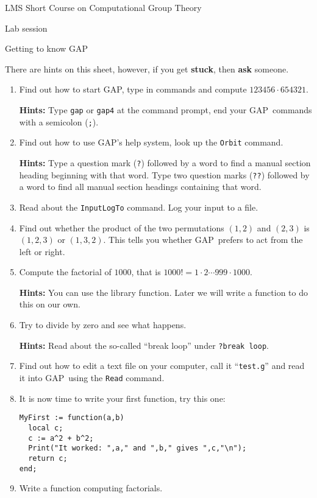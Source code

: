 \documentclass[12pt]{article}
\newcommand{\GAP}{\textsf{GAP}}
\begin{document}
\begin{center}
\large LMS Short Course on Computational Group Theory

\Large Lab session

\large Getting to know \GAP
\end{center}

There are hints on this sheet, however, if you get \textbf{stuck}, then
\textbf{ask} someone.

\begin{enumerate}
\setlength{\parskip}{0pt}
\item Find out how to start \GAP, type in commands and compute
$123456 \cdot 654321$.

\textbf{Hints:} Type \texttt{gap} or \texttt{gap4} at the command prompt,
end your \GAP\ commands with a semicolon (\texttt{;}).

\item Find out how to use \GAP's help system, look up the \texttt{Orbit}
command.

\textbf{Hints:} Type a question mark (\texttt{?}) followed by a word
to find a manual section heading beginning with that word. Type two
question marks (\texttt{??}) followed by a word to find all manual
section headings containing that word.

\item Read about the \texttt{InputLogTo} command. Log your input to a file.
\item Find out whether the product of the two permutations $(1,2)$ and
$(2,3)$ is $(1,2,3)$ or $(1,3,2)$. This tells you whether \GAP\ prefers
to act from the left or right.

\item Compute the factorial of $1000$, that is $1000! = 1 \cdot 2 \cdots
999 \cdot 1000$.

\textbf{Hints:} You can use the library function. Later we will write
a function to do this on our own.
\item Try to divide by zero and see what happens.

\textbf{Hints:} Read about the so-called ``break loop'' under
\texttt{?break loop}. 
\item Find out how to edit a text file on your computer, call it
``\texttt{test.g}'' and read it into \GAP\ using the \texttt{Read} command.
\item It is now time to write your first function, try this one:
{\small \begin{verbatim}
MyFirst := function(a,b)
  local c;
  c := a^2 + b^2;
  Print("It worked: ",a," and ",b," gives ",c,"\n");
  return c;
end;
\end{verbatim}}
\item Write a function computing factorials.


\end{enumerate}
\end{document}
